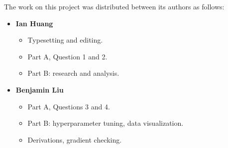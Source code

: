 \documentclass[10pt]{article}
\begin{document}
The work on this project was distributed between its authors as follows:

\begin{itemize}
    \item \textbf{Ian Huang}
        \begin{itemize}
            \item Typesetting and editing.
            \item Part A, Question 1 and 2.
            \item Part B: research and analysis.
        \end{itemize}
    \item \textbf{Benjamin Liu}
        \begin{itemize}
            \item Part A, Questions 3 and 4.
            \item Part B: hyperparameter tuning, data visualization.
            \item Derivations, gradient checking.
        \end{itemize}
\end{itemize}

\newpage


\end{document}
